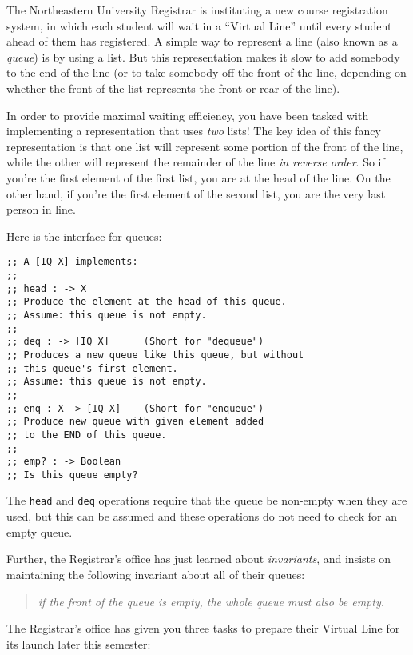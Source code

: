 \documentclass[12pt]{article}                   %
\def\pts#1{\marginpar{\footnotesize \raggedright  \fbox{#1 {\sc Points}}}}
\newcommand\code[1]{\texttt{#1}}
\begin{document}
\begin{problem} \pts{21}

The Northeastern University Registrar is instituting a new course
registration system, in which each student will wait in a ``Virtual
Line'' until every student ahead of them has registered.  A simple way
to represent a line (also known as a \emph{queue}) is by using a list.
But this representation makes it slow to add somebody to the end of
the line (or to take somebody off the front of the line, depending on
whether the front of the list represents the front or rear of the
line).  

In order to provide maximal waiting efficiency, you have been tasked
with implementing a representation that uses \emph{two} lists!  The
key idea of this fancy representation is that one list will represent
some portion of the front of the line, while the other will represent
the remainder of the line \emph{in reverse order}.  So if you're the
first element of the first list, you are at the head of the line.  On
the other hand, if you're the first element of the second list, you
are the very last person in line.

Here is the interface for queues:
\begin{verbatim}
;; A [IQ X] implements:
;;
;; head : -> X
;; Produce the element at the head of this queue.
;; Assume: this queue is not empty.
;;
;; deq : -> [IQ X]      (Short for "dequeue")
;; Produces a new queue like this queue, but without 
;; this queue's first element.
;; Assume: this queue is not empty.
;;
;; enq : X -> [IQ X]    (Short for "enqueue")
;; Produce new queue with given element added 
;; to the END of this queue.
;;
;; emp? : -> Boolean
;; Is this queue empty?
\end{verbatim}

The \code{head} and \code{deq} operations require that the queue be
non-empty when they are used, but this can be assumed and these
operations do not need to check for an empty queue.

Further, the Registrar's office has just learned about
\emph{invariants}, and insists on maintaining the following invariant
about all of their queues:

\begin{quote}
  {\it if the front of the queue is empty, the whole queue must also be empty.}
\end{quote} 

\noindent
The Registrar's office has given you three tasks to prepare their
Virtual Line for its launch later this semester:


\end{problem}
\end{document}
